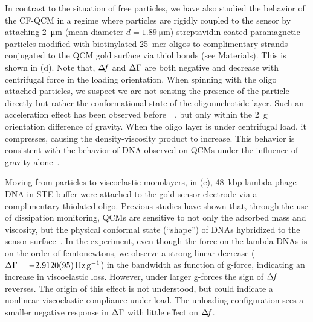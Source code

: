 In contrast to the situation of free particles, we have also studied the
behavior of the CF-QCM in a regime where particles are rigidly coupled to
the sensor by attaching \SI{2}{\micro\meter} (mean diameter
$\bar{d}=\SI{1.89}{\micro\meter}$) streptavidin coated paramagnetic
particles modified with biotinylated \SI{25}{mer} oligos to complimentary
strands conjugated to the QCM gold surface via thiol bonds (see
Materials).  This is shown in (d).  Note
that, $\Delta\!f$ and $\Delta\Gamma$ are both negative and decrease
with centrifugal force in the loading orientation.  
When spinning with the oligo attached
particles, we suspect we are not sensing the presence of the particle
directly but rather the conformational state of the oligonucleotide layer.
Such an acceleration effect has been observed
before~\cite{yoshimoto2002effect}~\cite{fawcett2004evidence}, but only
within the \SI{2}{g} orientation difference of gravity.  When the oligo
layer is under centrifugal load, it compresses, causing the
density-viscosity product to increase.  This behavior is consistent with
the behavior of DNA observed on QCMs under the influence of gravity
alone~\cite{fawcett2004evidence}.

Moving from particles to viscoelastic monolayers, in
(e), \SI{48}{kbp} lambda phage DNA in STE buffer were
attached to the gold sensor electrode via a complimentary thiolated oligo.  Previous studies have shown that,
through the use of dissipation monitoring, QCMs are sensitive to not only
the adsorbed mass and viscosity, but the physical conformal state
(``shape'') of DNAs hybridized to the sensor
surface~\cite{tsortos2008shear}.  In the experiment, even though the force
on the lambda DNAs is on the order of femtonewtons, we observe a strong
linear decrease ($\dg=\SI{-2.912+-0.0095}{\hertz\per\g}$) in the
bandwidth as function of g-force, indicating an
increase in viscoelastic loss.  However, under larger g-forces the sign of
$\Delta\!f$ reverses.  The origin of this effect is not understood, but
could indicate a nonlinear viscoelastic compliance under load.  The
unloading configuration sees a smaller negative response in $\Delta\Gamma$ with little
effect on $\Delta\!f$.

